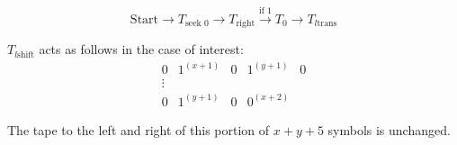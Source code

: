 $$\text{Start} \rightarrow T_{\text{seek 0}} \rightarrow T_{\text{right}} \xrightarrow{\text{if 1}} T_0 \rightarrow T_{l\text{trans}}$$

$T_{l\text{shift}}$ acts as follows in the case of interest:
\[
\begin{array}{c}
0 & 1^{(x+1)} & 0 & 1^{(y+1)} & 0 \\
\vdots \\
0 & 1^{(y+1)} & 0 & 0^{(x+2)}
\end{array}
\]

The tape to the left and right of this portion of $x + y + 5$ symbols is unchanged.
